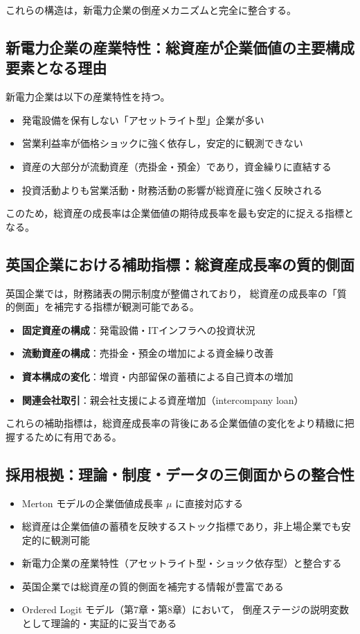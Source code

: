 これらの構造は，新電力企業の倒産メカニズムと完全に整合する。

\subsection{新電力企業の産業特性：総資産が企業価値の主要構成要素となる理由}

新電力企業は以下の産業特性を持つ。

\begin{itemize}
    \item 発電設備を保有しない「アセットライト型」企業が多い
    \item 営業利益率が価格ショックに強く依存し，安定的に観測できない
    \item 資産の大部分が流動資産（売掛金・預金）であり，資金繰りに直結する
    \item 投資活動よりも営業活動・財務活動の影響が総資産に強く反映される
\end{itemize}

このため，総資産の成長率は企業価値の期待成長率を最も安定的に捉える指標となる。

\subsection{英国企業における補助指標：総資産成長率の質的側面}

英国企業では，財務諸表の開示制度が整備されており，
総資産の成長率の「質的側面」を補完する指標が観測可能である。

\begin{itemize}
    \item \textbf{固定資産の構成}：発電設備・ITインフラへの投資状況
    \item \textbf{流動資産の構成}：売掛金・預金の増加による資金繰り改善
    \item \textbf{資本構成の変化}：増資・内部留保の蓄積による自己資本の増加
    \item \textbf{関連会社取引}：親会社支援による資産増加（intercompany loan）
\end{itemize}

これらの補助指標は，総資産成長率の背後にある企業価値の変化をより精緻に把握するために有用である。

\subsection{採用根拠：理論・制度・データの三側面からの整合性}

\begin{itemize}
    \item Merton モデルの企業価値成長率 $\mu$ に直接対応する
    \item 総資産は企業価値の蓄積を反映するストック指標であり，非上場企業でも安定的に観測可能
    \item 新電力企業の産業特性（アセットライト型・ショック依存型）と整合する
    \item 英国企業では総資産の質的側面を補完する情報が豊富である
    \item Ordered Logit モデル（第7章・第8章）において，
          倒産ステージの説明変数として理論的・実証的に妥当である
\end{itemize}

